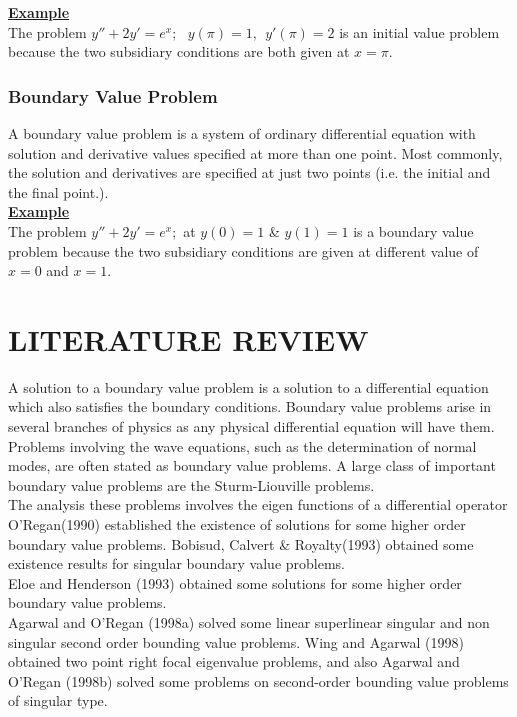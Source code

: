 \documentclass[12pt]{report}
\newcommand{\ubt}[1]{\textbf{\underline{#1}}}
\newcommand{\sps}{\\[0.2cm]}
\newcommand{\NI}{\noindent}
\newcommand{\dsp}{\displaystyle}
\newcommand{\sprime}{'}
\newcommand{\dprime}{''}
\begin{document}
	\NI\ubt{Example}\sps
	The problem $\dsp y\dprime + 2y\sprime = e^x; ~~~ y(\pi) = 1, ~~ y\sprime(\pi) = 2$ is an initial value problem because the two subsidiary conditions are both given at $x=\pi$.
	
	\subsection{Boundary Value Problem}
	A boundary value problem is a system of ordinary differential equation with solution and derivative values specified at more than one point. Most commonly, the solution and derivatives are specified at just two points (i.e. the initial and the final point.).\\
	
	\NI\ubt{Example}\sps
	The problem $\dsp y\dprime + 2y\sprime = e^x;$ at $y(0)=1$ \& $y(1)=1$ is a boundary value problem because the two subsidiary conditions are given at different value of $x=0$ and $x=1$.
	
	
	\chapter{LITERATURE REVIEW}
	A solution to a boundary value problem is a solution to a differential equation which also satisfies the boundary conditions. Boundary value problems arise in several branches of physics as any physical differential equation will have them. Problems involving the wave equations, such as the determination of normal modes, are often stated as boundary value problems. A large class of important boundary value problems are the Sturm-Liouville problems.\sps
	
	\NI The analysis  these problems involves the eigen functions of a differential operator O'Regan(1990) established the existence of solutions for some higher order boundary value problems. Bobisud, Calvert \& Royalty(1993) obtained some existence results for singular boundary value problems.\sps
	
	\NI Eloe and Henderson (1993) obtained some solutions for some higher order boundary value problems. \sps
	
	\NI Agarwal and O'Regan (1998a) solved some linear superlinear singular and non singular second order bounding value problems. Wing and Agarwal (1998) obtained two point right focal eigenvalue problems, and also Agarwal and O'Regan (1998b) solved some problems on second-order bounding value problems of singular type.\sps
	
\end{document}

